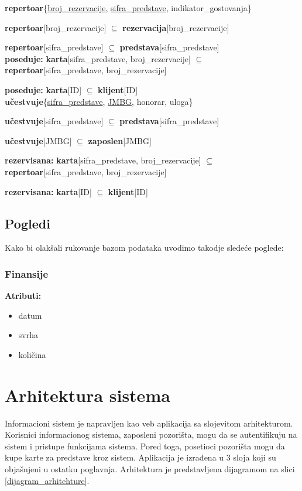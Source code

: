 \documentclass[a4paper]{article}
\begin{document}
\textbf{repertoar}\{\underline{broj\_rezervacije}, \underline{sifra\_predstave}, indikator\_gostovanja\}

\textbf{repertoar}[broj\_rezervacije] $\subseteq$ \textbf{rezervacija}[broj\_rezervacije]

\textbf{repertoar}[sifra\_predstave] $\subseteq$ \textbf{predstava}[sifra\_predstave]\\

\textbf{poseduje:} \textbf{karta}[sifra\_predstave, broj\_rezervacije] 
$\subseteq$ \textbf{repertoar}[sifra\_predstave, broj\_rezervacije]

\textbf{poseduje:} \textbf{karta}[ID] $\subseteq$ \textbf{klijent}[ID]\\

\textbf{učestvuje}\{\underline{sifra\_predstave}, \underline{JMBG}, honorar, uloga\}

\textbf{učestvuje}[sifra\_predstave] $\subseteq$ \textbf{predstava}[sifra\_predstave]

\textbf{učestvuje}[JMBG] $\subseteq$ \textbf{zaposlen}[JMBG]

\textbf{rezervisana:} \textbf{karta}[sifra\_predstave, broj\_rezervacije]
$\subseteq$ \textbf{repertoar}[sifra\_predstave, broj\_rezervacije]

\textbf{rezervisana:} \textbf{karta}[ID] $\subseteq$ \textbf{klijent}[ID]

\subsection{Pogledi}

Kako bi olakšali rukovanje bazom podataka uvodimo takodje sledeće poglede:
\subsubsection{Finansije}
\textbf{Atributi:}
\begin{itemize}
  \item datum 
  \item svrha 
  \item količina
\end{itemize}

\section{Arhitektura sistema}
Informacioni sistem je napravljen kao veb aplikacija sa slojevitom arhitekturom. Korisnici informacionog sistema, zaposleni pozorišta, mogu da se autentifikuju na sistem i pristupe funkcijama sistema. Pored toga, posetioci pozorišta mogu da kupe karte za predstave kroz sistem. Aplikacija je izrađena u 3 sloja koji su objašnjeni u ostatku poglavnja. Arhitektura je predstavljena dijagramom na slici \ref{dijagram_arhitehture}.
\end{document}
